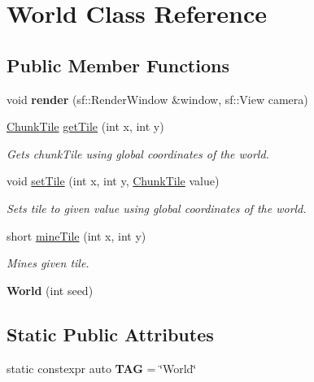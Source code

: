 \hypertarget{classWorld}{\section{World Class Reference}
\label{classWorld}
}
\subsection*{Public Member Functions}
\begin{DoxyCompactItemize}
\item 
\hypertarget{classWorld_ad41d823a21794ad47ac4478677b0ae7f}{void {\bfseries render} (sf\-::\-Render\-Window \&window, sf\-::\-View camera)}\label{classWorld_ad41d823a21794ad47ac4478677b0ae7f}

\item 
\hypertarget{classWorld_ad8d693762cae3c31ec90fef9b44b97bf}{\hyperlink{structChunkTile}{Chunk\-Tile} \hyperlink{classWorld_ad8d693762cae3c31ec90fef9b44b97bf}{get\-Tile} (int x, int y)}\label{classWorld_ad8d693762cae3c31ec90fef9b44b97bf}

\begin{DoxyCompactList}\small\item\em Gets chunk\-Tile using global coordinates of the world. \end{DoxyCompactList}\item 
\hypertarget{classWorld_a9d374f8600da3aa484e48a5887772340}{void \hyperlink{classWorld_a9d374f8600da3aa484e48a5887772340}{set\-Tile} (int x, int y, \hyperlink{structChunkTile}{Chunk\-Tile} value)}\label{classWorld_a9d374f8600da3aa484e48a5887772340}

\begin{DoxyCompactList}\small\item\em Sets tile to given value using global coordinates of the world. \end{DoxyCompactList}\item 
short \hyperlink{classWorld_a1bbfac1b517a991c30aa96b57d04d265}{mine\-Tile} (int x, int y)
\begin{DoxyCompactList}\small\item\em Mines given tile. \end{DoxyCompactList}\item 
\hypertarget{classWorld_a4598832293e050abba792d1b4367a368}{{\bfseries World} (int seed)}\label{classWorld_a4598832293e050abba792d1b4367a368}

\end{DoxyCompactItemize}
\subsection*{Static Public Attributes}
\begin{DoxyCompactItemize}
\item 
\hypertarget{classWorld_a9ebf0ccc9a330d5f3e4ed8401d64e5f6}{static constexpr auto {\bfseries T\-A\-G} = \char`\"{}World\char`\"{}}\label{classWorld_a9ebf0ccc9a330d5f3e4ed8401d64e5f6}

\end{DoxyCompactItemize}


